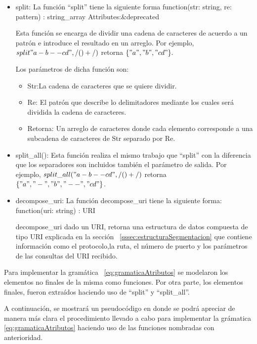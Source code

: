 \begin{itemize}
\item split:
La función “split” tiene la siguiente forma
function(str: string, re: pattern) : string\_array Attributes:\&deprecated

Esta función se encarga de dividir una cadena de caracteres de acuerdo a un patrón e introduce el resultado en un arreglo. Por ejemplo, $split"a-b--cd", /(\-)+/)$ retorna $\{"a", "b", "cd"\}.$

Los parámetros de dicha función son:

\begin{itemize}
\item Str:La cadena de caracteres que se quiere dividir. 
\item Re: El patrón que describe lo delimitadores mediante los cuales será dividida la cadena de caracteres. 
\item Retorna: Un arreglo de caracteres donde cada elemento corresponde a una subcadena de caracteres de Str separado por Re.
\end{itemize}

\item split\_all():
Esta función realiza el mismo trabajo que “split” con la diferencia que los separadores son incluidos también el parámetro de salida.  Por ejemplo, $split\_all("a-b--cd", /(\-)+/)$ retorna $\{"a", "-", "b", "--", "cd"\}$.

\item decompose\_uri:
La función decompose\_uri tiene la siguiente forma: function(uri: string) : URI

decompose\_uri dado un URI, retorna una estructura de datos compuesta de tipo URI explicada en la sección ~\ref{sssec:estructuraSegmentacion} que contiene información como el protocolo,la ruta, el número de puerto y los parámetros de las consultas del URI recibido.
\end{itemize}

Para implementar la gramática ~\ref{eq:gramaticaAtributos} se modelaron los elementos no finales de la misma como funciones. Por otra parte, los elementos finales, fueron extraídos haciendo uso de “split” y “split\_all”.

A continuación, se mostrará un pseudocódigo en donde se podrá apreciar de manera más clara el procedimiento llevado a cabo para implementar la grámatica \ref{eq:gramaticaAtributos} haciendo uso de las funciones nombradas con anterioridad.

